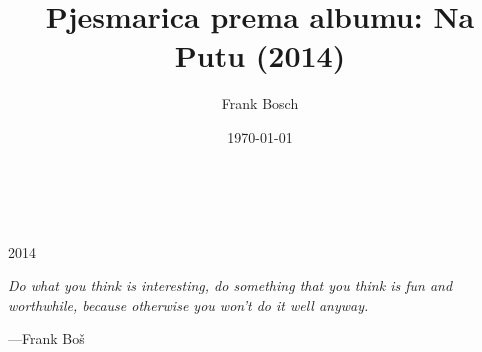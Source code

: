 \documentclass[a4paper,twoside]{article}
\title{Pjesmarica prema albumu: Na Putu (2014)}
\author{Frank Bosch}
\date{\today}
\begin{document}
\begin{titlepage}
		\\
			
		\vspace{168mm}
		\ttfamily{}\\
		\vspace{\fill}
		\ttfamily\centering \large{2014}
\end{titlepage}

\newpage{}
\thispagestyle {empty}

\vspace*{2cm}

\begin{center}

	\Large{\parbox{10cm}{
		\begin{raggedright}
		{\Large 
			\textit{Do what you think is interesting, 
			do something that you think is fun and worthwhile, 
			because otherwise you won’t do it well anyway.}
		}
	
		\vspace{.5cm}\hfill{---Frank Boš}
		\end{raggedright}
	}
}
\end{center}

\newpage


\renewcommand\contentsname{Inhalt}
\tableofcontents
\newpage

\begin{minipage}[b]{0.5\linewidth}

\end{minipage}
\newpage

\begin{minipage}[b]{0.5\linewidth}

\end{minipage}
\newpage
\end{document}
